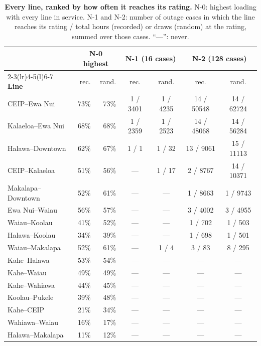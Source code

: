 \documentclass[11pt,a4paper]{article}
\begin{document}
\begin{table}[!htbp]
\centering
\small
\caption{\textbf{Every line, ranked by how often it reaches its rating.} N-0: highest
loading with every line in service. N-1 and N-2: number of outage cases in which the
line reaches its rating / total hours (recorded) or draws (random) at the rating,
summed over those cases. ``---'': never.}
\label{tab:rank}
\begin{tabular}{@{}lrrcccc@{}}
\toprule
& \multicolumn{2}{c}{\textbf{N-0 highest}} & \multicolumn{2}{c}{\textbf{N-1 (16 cases)}} &
  \multicolumn{2}{c}{\textbf{N-2 (128 cases)}} \\
\cmidrule(lr){2-3}\cmidrule(lr){4-5}\cmidrule(l){6-7}
\textbf{Line} & rec. & rand. & rec. & rand. & rec. & rand. \\
\midrule
CEIP--Ewa Nui & 73\% & 73\% & 1 / \num{3401} & 1 / \num{4235} & 14 / \num{50548} & 14 / \num{62724} \\
Kalaeloa--Ewa Nui & 68\% & 68\% & 1 / \num{2359} & 1 / \num{2523} & 14 / \num{48068} & 14 / \num{56284} \\
Halawa--Downtown & 62\% & 67\% & 1 / \num{1} & 1 / \num{32} & 13 / \num{9061} & 15 / \num{11113} \\
CEIP--Kalaeloa & 51\% & 56\% & --- & 1 / \num{17} & 2 / \num{8767} & 14 / \num{10371} \\
Makalapa--Downtown & 52\% & 61\% & --- & --- & 1 / \num{8663} & 1 / \num{9743} \\
Ewa Nui--Waiau & 56\% & 57\% & --- & --- & 3 / \num{4002} & 3 / \num{4955} \\
Waiau--Koolau & 41\% & 52\% & --- & --- & 1 / \num{702} & 1 / \num{503} \\
Halawa--Koolau & 34\% & 39\% & --- & --- & 1 / \num{698} & 1 / \num{501} \\
Waiau--Makalapa & 52\% & 61\% & --- & 1 / \num{4} & 3 / \num{83} & 8 / \num{295} \\
Kahe--Halawa & 53\% & 54\% & --- & --- & --- & --- \\
Kahe--Waiau & 49\% & 49\% & --- & --- & --- & --- \\
Kahe--Wahiawa & 44\% & 45\% & --- & --- & --- & --- \\
Koolau--Pukele & 39\% & 48\% & --- & --- & --- & --- \\
Kahe--CEIP & 21\% & 34\% & --- & --- & --- & --- \\
Wahiawa--Waiau & 16\% & 17\% & --- & --- & --- & --- \\
Halawa--Makalapa & 11\% & 12\% & --- & --- & --- & --- \\
\bottomrule
\end{tabular}
\end{table}
\end{document}
